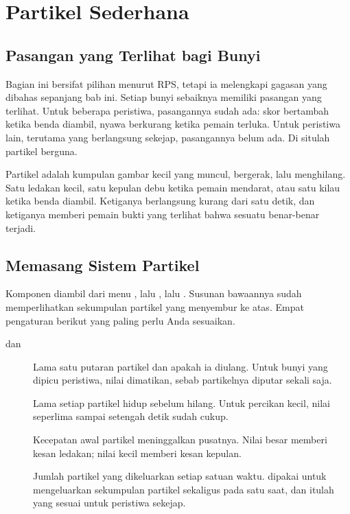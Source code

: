\section{Partikel Sederhana}
\label{sec:partikel}

\subsection{Pasangan yang Terlihat bagi Bunyi}

Bagian ini bersifat pilihan menurut RPS, tetapi ia melengkapi gagasan yang
dibahas sepanjang bab ini. Setiap bunyi sebaiknya memiliki pasangan yang
terlihat. Untuk beberapa peristiwa, pasangannya sudah ada: skor bertambah
ketika benda diambil, nyawa berkurang ketika pemain terluka. Untuk peristiwa
lain, terutama yang berlangsung sekejap, pasangannya belum ada. Di situlah
partikel berguna.

Partikel adalah kumpulan gambar kecil yang muncul, bergerak, lalu menghilang.
Satu ledakan kecil, satu kepulan debu ketika pemain mendarat, atau satu kilau
ketika benda diambil. Ketiganya berlangsung kurang dari satu detik, dan
ketiganya memberi pemain bukti yang terlihat bahwa sesuatu benar-benar terjadi.

\subsection{Memasang Sistem Partikel}

Komponen  diambil dari menu , lalu
, lalu . Susunan bawaannya sudah
memperlihatkan sekumpulan partikel yang menyembur ke atas. Empat pengaturan
berikut yang paling perlu Anda sesuaikan.

\begin{description}
  \item[ dan ] Lama satu putaran partikel
        dan apakah ia diulang. Untuk bunyi yang dipicu peristiwa, nilai
         dimatikan, sebab partikelnya diputar sekali saja.
  \item[] Lama setiap partikel hidup sebelum hilang.
        Untuk percikan kecil, nilai seperlima sampai setengah detik sudah
        cukup.
  \item[] Kecepatan awal partikel meninggalkan pusatnya.
        Nilai besar memberi kesan ledakan; nilai kecil memberi kesan kepulan.
  \item[] Jumlah partikel yang dikeluarkan setiap satuan
        waktu.  dipakai untuk mengeluarkan sekumpulan partikel
        sekaligus pada satu saat, dan itulah yang sesuai untuk peristiwa
        sekejap.
\end{description}

